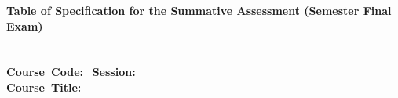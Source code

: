 \begin{center}
	\textbf{\large Table of Specification for the Summative Assessment (Semester Final Exam)}\\[6pt]
	\textbf{\large{\deptName{}}}\\[2pt]
	\textbf{\examName{}}\\[2pt]
	\textbf{Course~Code:}~\courseCode{} \hspace{10mm} \textbf{Session:}~\SessionExaminee\\[2pt]
	\textbf{Course~Title:}~\courseTitle{}
\end{center}